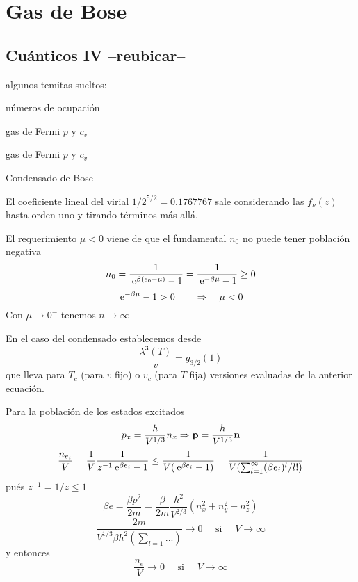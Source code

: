 \documentclass[10pt,oneside]{CBFT_book}
\begin{document}
\chapter{Gas de Bose}


\section{Cuánticos IV --reubicar--}

algunos temitas sueltos:

números de ocupación

gas de Fermi $p$ y $c_v$

gas de Fermi $p$ y $c_v$

Condensado de Bose


El coeficiente lineal del virial $ 1/ 2^{5/2} = 0.1767767 $ sale considerando las $ f_{\nu}(z) $ hasta orden
uno y tirando términos más allá.


El requerimiento $ \mu < 0 $ viene de que el fundamental $ n_0 $ no puede tener población negativa
\[
	n_0 = \frac{1}{\:\mathrm{e}^{\beta(e_0 - \mu)} -1} = \frac{1}{\:\mathrm{e}^{-\beta\mu} -1} \geq 0
\]
\[
	\:\mathrm{e}^{-\beta\mu} -1 > 0 \qquad \Rightarrow \quad \mu < 0
\]
Con $\mu \to 0^-$ tenemos $ n \to \infty $

En el caso del condensado establecemos desde 
\[
	\frac{\lambda^3(T)}{v} = g_{3/2}(1) 
\]
que lleva para $T_c$ (para $v$ fijo) o $v_c$ (para $T$ fija) versiones evaluadas de la anterior ecuación.

Para la población de los estados excitados
\[
	p_x = \frac{h}{V^{1/3}}n_x \Rightarrow  \vb{p} = \frac{h}{V^{1/3}} \vb{n}
\]
\[
	\frac{n_{e_i}}{V} = \frac{1}{V} \frac{1}{ z^{-1}\:\mathrm{e}^{\beta e_i} - 1 } \leq 
	\frac{1}{V(\:\mathrm{e}^{\beta e_i} - 1)} = \frac{1}{V(\sum_{l=1}^\infty (\beta e_i )^l/l!)}
\]
pués $z^{-1} = 1/z \leq 1$
\[
	\beta e = \frac{\beta p^2}{2m} = \frac{\beta}{2m} \frac{h^2}{V^{2/3}} ( n_x^2 + n_y^2 + n_z^2)
\]
\[
	\frac{2m}{V^{1/3} \beta h^2 (\sum_{l=1} ... )} \to 0 \quad \text{ si } \quad V \to \infty
\]
y entonces
\[
	\frac{n_e}{V} \to 0 \quad \text{ si } \quad V \to \infty
\]
\end{document}
